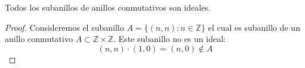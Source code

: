 \begin{ce}
    Todos los subanillos de anillos conmutativos son ideales.
\end{ce}

\begin{proof}
    Consideremos el subanillo $A = \{(n,n): n \in \mathbb{Z}\}$ el cual es subanillo de un anillo conmutativo $A \subset \mathbb{Z} \times \mathbb{Z}$. Este subanillo no es un ideal:
    \begin{equation}
        (n,n) \cdot (1,0) = (n,0) \not\in A
    \end{equation}
\end{proof}
